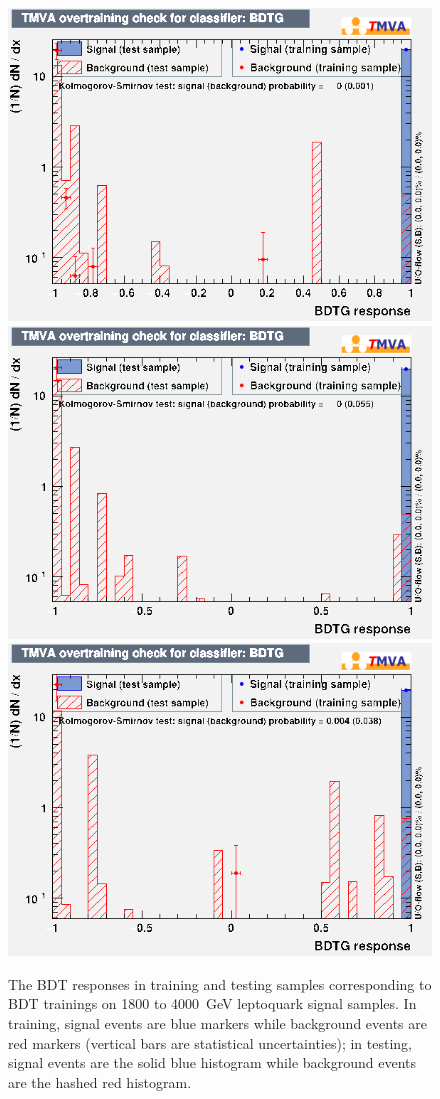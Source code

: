 \begin{figure}[H]
    {\includegraphics[width=.32\textwidth]{Images/Analysis/Results_LQToBMu_pair_uubj_BDTG_FullRun2_2023_01_25_020318/3000/overtrain_BDTG.png}}
    {\includegraphics[width=.32\textwidth]{Images/Analysis/Results_LQToBMu_pair_uubj_BDTG_FullRun2_2023_01_25_020318/3500/overtrain_BDTG.png}}
    {\includegraphics[width=.32\textwidth]{Images/Analysis/Results_LQToBMu_pair_uubj_BDTG_FullRun2_2023_01_25_020318/4000/overtrain_BDTG.png}}
    \caption{The BDT responses in training and testing samples corresponding to BDT trainings on 1800 to \SI{4000}{GeV} leptoquark signal samples. In training, signal events are blue markers while background events are red markers (vertical bars are statistical uncertainties); in testing, signal events are the solid blue histogram while background events are the hashed red histogram.}
    \label{figapp:overtraining2}
\end{figure}

